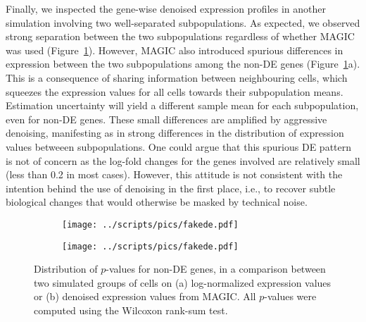 \documentclass[10pt,letterpaper]{article}
\begin{document}
Finally, we inspected the gene-wise denoised expression profiles in another simulation involving two well-separated subpopulations.
As expected, we observed strong separation between the two subpopulations regardless of whether MAGIC was used (Figure~\ref{fig:twoclusters}).
However, MAGIC also introduced spurious differences in expression between the two subpopulations among the non-DE genes (Figure~\ref{fig:twoclusters}a).
This is a consequence of sharing information between neighbouring cells, which squeezes the expression values for all cells towards their subpopulation means.
Estimation uncertainty will yield a different sample mean for each subpopulation, even for non-DE genes.
These small differences are amplified by aggressive denoising, manifesting as in strong differences in the distribution of expression values betweeen subpopulations.
One could argue that this spurious DE pattern is not of concern as the log-fold changes for the genes involved are relatively small (less than 0.2 in most cases).
However, this attitude is not consistent with the intention behind the use of denoising in the first place, 
i.e., to recover subtle biological changes that would otherwise be masked by technical noise.

\begin{figure}[btp]
\centering
\begin{subfigure}[b]{0.49\textwidth}
    \texttt{[image: ../scripts/pics/fakede.pdf]}
    \caption{}
\end{subfigure}
\begin{subfigure}[b]{0.49\textwidth}
    \texttt{[image: ../scripts/pics/fakede.pdf]}
    \caption{}
\end{subfigure}
\caption{Distribution of $p$-values for non-DE genes, 
in a comparison between two simulated groups of cells on (a) log-normalized expression values or (b) denoised expression values from MAGIC.
All $p$-values were computed using the Wilcoxon rank-sum test.}
\label{fig:twoclusters}
\end{figure}
\end{document}
